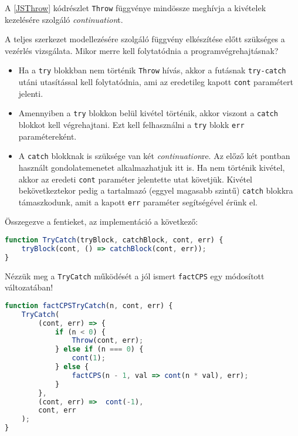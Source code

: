 A \ref{JSThrow} kódrészlet \texttt{Throw} függvénye mindössze meghívja a kivételek kezelésére szolgáló \textit{continuation}t.

A teljes szerkezet modellezésére szolgáló függvény elkészítése előtt szükséges a vezérlés vizsgálata. Mikor merre kell folytatódnia a programvégrehajtásnak?

\begin{itemize}
    \item Ha a \texttt{try} blokkban nem történik \texttt{Throw} hívás, akkor a futásnak \texttt{try-catch} utáni utasítással kell folytatódnia, ami az eredetileg kapott \texttt{cont} paramétert jelenti.
    \item Amennyiben a \texttt{try} blokkon belül kivétel történik, akkor viszont a \texttt{catch} blokkot kell végrehajtani. Ezt kell felhasználni a \texttt{try} blokk \texttt{err} paramétereként.
    \item A \texttt{catch} blokknak is szüksége van két \textit{continuation}re. Az előző két pontban használt gondolatemenetet alkalmazhatjuk itt is. Ha nem történik kivétel, akkor az eredeti \texttt{cont} paraméter jelentette utat követjük. Kivétel bekövetkeztekor pedig a tartalmazó (eggyel magasabb szintű) \texttt{catch} blokkra támaszkodunk, amit a kapott \texttt{err} paraméter segítségével érünk el.
\end{itemize}

Összegezve a fentieket, az implementáció a következő:

\begin{lstlisting}[language=JavaScript, caption={A \textit{try-catch} blokk \textit{CPS}-ben}, captionpos=b, label=JSTryCatch]
function TryCatch(tryBlock, catchBlock, cont, err) {
    tryBlock(cont, () => catchBlock(cont, err));
}
\end{lstlisting}

Nézzük meg a \texttt{TryCatch} működését a jól ismert \texttt{factCPS} egy módosított változatában!

\begin{lstlisting}[language=JavaScript, caption={Faktoriálist kiszámító függvény \textit{CPS}-ben, \texttt{try-catch} szerkezettel}, captionpos=b, label=JSCPSFactTryCatch]
function factCPSTryCatch(n, cont, err) {
    TryCatch(
        (cont, err) => {
            if (n < 0) {
                Throw(cont, err); 
            } else if (n === 0) {
                cont(1);
            } else {
                factCPS(n - 1, val => cont(n * val), err);
            }    
        }, 
        (cont, err) =>  cont(-1),
        cont, err
    );
}
\end{lstlisting}

